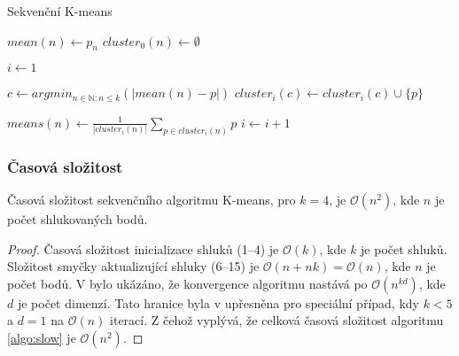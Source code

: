 \documentclass[a4paper, 11pt, fleqn]{scrartcl}
\begin{document}
      \begin{algorithm}[!h]
        \label{algo:slow}
        \SetAlgoLined
        \DontPrintSemicolon
        \caption{Sekvenční K-means}

        \vspace*{2mm}

        {
          $mean(n) \leftarrow p_n$\;
          $cluster_0(n) \leftarrow \emptyset$\;
        }

        \vspace*{2mm}

        $i \leftarrow 1$\;
        {
          {
            $c \leftarrow arg min_{n \in \mathbb{N} : n \leq k}(|mean(n) - p|)$\;
            $cluster_i(c) \leftarrow cluster_i(c) \cup \{p\}$\;
          }

          \vspace*{2mm}

            {
              $means(n) \leftarrow \frac{1}{|cluster_i(n)|} \sum_{p \in cluster_i(n)}p$
            }
          $i \leftarrow i + 1$\;
        }

        \vspace*{2mm}

      \end{algorithm}

      \vspace*{-1em}

      \subsubsection{Časová složitost}
        Časová složitost sekvenčního algoritmu K-means, pro $k = 4$, je $\mathcal{O}(n^2)$, kde $n$ je počet shlukovaných bodů.

        \begin{proof}
          Časová složitost inicializace shluků (1--4) je $\mathcal{O}(k)$, kde $k$ je počet shluků. Složitost smyčky aktualizující shluky (6--15) je $\mathcal{O}(n + nk) = \mathcal{O}(n)$, kde $n$ je počet bodů. V \cite{slow} bylo ukázáno, že konvergence algoritmu nastává po $\mathcal{O}(n^{kd})$, kde $d$ je počet dimenzí. Tato hranice byla v \cite{fast} upřesněna pro speciální případ, kdy $k < 5$ a $d = 1$ na $\mathcal{O}(n)$ iterací. Z čehož vyplývá, že celková časová složitost algoritmu \ref{algo:slow} je $\mathcal{O}(n^2)$.
        \end{proof}
\end{document}
